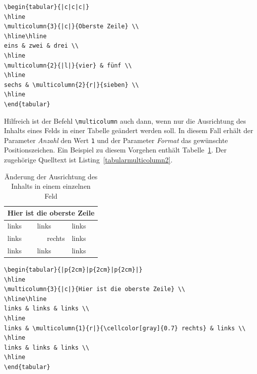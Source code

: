 \documentclass[a4paper,10pt,twoside]{scrbook}
\begin{document}
{\begin{lstlisting}[caption={Der Befehl \texttt{multicolumn} kann Felder über Spalten hinweg zusammenfassen},label=tabularmulticolumn1, style=customlatex]
\begin{tabular}{|c|c|c|}
\hline
\multicolumn{3}{|c|}{Oberste Zeile} \\
\hline\hline
eins & zwei & drei \\
\hline
\multicolumn{2}{|l|}{vier} & fünf \\
\hline
sechs & \multicolumn{2}{r|}{sieben} \\
\hline
\end{tabular}
\end{lstlisting}

Hilfreich ist der Befehl \verb!\multicolumn! auch dann, wenn nur die Ausrichtung des Inhalts eines Felds in einer Tabelle geändert werden soll. In
diesem Fall erhält der Parameter \textsl{Anzahl} den Wert \verb!1! und der Parameter \textsl{Format} das gewünschte Positionszeichen. 
Ein Beispiel zu diesem Vorgehen enthält Tabelle~\ref{Tabelle_Multicolumn2}. Der zugehörige Quelltext ist Listing~\ref{tabularmulticolumn2}.


\begin{table}[h!tb]
\centering
\caption{Änderung der Ausrichtung des Inhalts in einem einzelnen Feld}
\label{Tabelle_Multicolumn2}
\begin{tabular}{|p{2cm}|p{2cm}|p{2cm}|}
\hline
\multicolumn{3}{|c|}{Hier ist die oberste Zeile} \\
\hline\hline
links & links & links \\
\hline
links & \multicolumn{1}{r|}{\cellcolor[gray]{0.7} rechts} & links \\
\hline
links & links & links \\
\hline
\end{tabular}
\end{table}

\begin{lstlisting}[caption={Mit dem Befehl \texttt{multicolumn} kann auch die Ausrichtung nur eines einzelnen Feldes angepasst werden},label=tabularmulticolumn2, style=customlatex]
\begin{tabular}{|p{2cm}|p{2cm}|p{2cm}|}
\hline
\multicolumn{3}{|c|}{Hier ist die oberste Zeile} \\
\hline\hline
links & links & links \\
\hline
links & \multicolumn{1}{r|}{\cellcolor[gray]{0.7} rechts} & links \\
\hline
links & links & links \\
\hline
\end{tabular}
\end{lstlisting}


}
\end{document}
